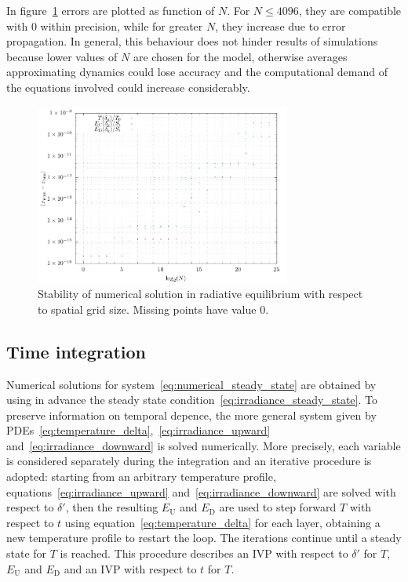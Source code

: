 \documentclass[a4paper,10pt,twocolumn,\classoptions]{article}
\begin{document}
In figure~\ref{fig:stability} errors are plotted as function of $N$. For $N \leq 4096$, they are compatible with 0 within precision, while for greater $N$, they increase due to error propagation. In general, this behaviour does not hinder results of simulations because lower values of $N$ are chosen for the model, otherwise averages approximating dynamics could lose accuracy and the computational demand of the equations involved could increase considerably.
\begin{figure}[h]
  \centering
  \includegraphics*[keepaspectratio=true,width=0.75\textwidth]{stability}
  \caption{Stability of numerical solution in radiative equilibrium with respect to spatial grid size. Missing points have value 0.}
  \label{fig:stability}
\end{figure}



\subsection{Time integration}
\label{sec:Time integration}
Numerical solutions for system~\eqref{eq:numerical_steady_state} are obtained by using in advance the steady state condition~\eqref{eq:irradiance_steady_state}. To preserve information on temporal depence, the more general system given by PDEs~\eqref{eq:temperature_delta},~\eqref{eq:irradiance_upward} and~\eqref{eq:irradiance_downward} is solved numerically.
More precisely, each variable is considered separately during the integration and an iterative procedure is adopted: starting from an arbitrary temperature profile, equations~\eqref{eq:irradiance_upward} and~\eqref{eq:irradiance_downward} are solved with respect to $\delta'$, then the resulting $E_\text{U}$ and $E_\text{D}$ are used to step forward $T$ with respect to $t$ using equation~\eqref{eq:temperature_delta} for each layer, obtaining a new temperature profile to restart the loop. The iterations continue until a steady state for $T$ is reached. This procedure describes an IVP with respect to $\delta'$ for $T$, $E_\text{U}$ and $E_\text{D}$ and an IVP with respect to $t$ for $T$.
\end{document}
